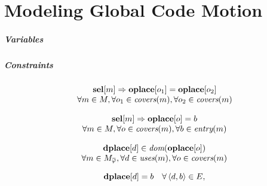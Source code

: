 %

\chapter{Modeling Global Code Motion}

\paragraph{Variables}

\paragraph{Constraints}

\begin{equation}
  \begin{array}{c}
    \mVar{sel}[m] \mImp \mVar{oplace}[o_1] = \mVar{oplace}[o_2] \\
    \forall m \in \mMatchSet,
    \forall o_1 \in \mCovers(m),
    \forall o_2 \in \mCovers(m)
  \end{array}
  \labelEquation{operation-placement}
\end{equation}

\begin{equation}
  \begin{array}{c}
    \mVar{sel}[m] \mImp \mVar{oplace}[o] = b \\
    \forall m \in \mMatchSet,
    \forall o \in \mCovers(m),
    \forall b \in \mEntry(m)
  \end{array}
  \labelEquation{jump-placements}
\end{equation}

\begin{equation}
  \begin{array}{c}
    \mVar{dplace}[d] \in \mDom(\mVar{oplace}[o]) \\
    \forall m \in \mMatchCompSet{\mPhi},
    \forall d \in \mUses(m),
    \forall o \in \mCovers(m)
  \end{array}
  \labelEquation{dom}
\end{equation}

\begin{equation}
  \mVar{dplace}[d] = b
  \mQuantSep
  \forall \mUnDirEdge{d}{b} \in \mDefEdgeSet,
  \labelEquation{def-edges}
\end{equation}

